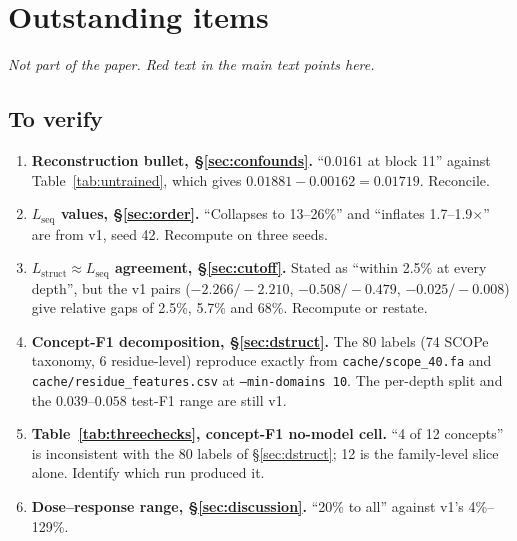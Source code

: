 \documentclass{article} %
\newcommand{\red}[1]{\textcolor{red}{#1}}
\renewcommand{\red}[1]{#1}
\newcommand{\Lstruct}{\ensuremath{L_{\mathrm{struct}}}}
\newcommand{\Lseq}{\ensuremath{L_{\mathrm{seq}}}}
\begin{document}



\appendix

\ifdefined\CLEANCOPY\else
\section{Outstanding items}
\label{app:working}

\red{\emph{Not part of the paper. Red text in the main text points here.}}

\subsection{To verify}

\begin{enumerate}[label=C\arabic*., ref=C\arabic*, leftmargin=2.6em]

\item \label{c:recon} \textbf{Reconstruction bullet, \S\ref{sec:confounds}.} ``$0.0161$ at block
11'' against Table~\ref{tab:untrained}, which gives $0.01881 - 0.00162 = 0.01719$. Reconcile.

\item \label{c:lseq} \textbf{\Lseq{} values, \S\ref{sec:order}.} ``Collapses to 13--26\%'' and
``inflates 1.7--1.9$\times$'' are from v1, seed 42. Recompute on three seeds.

\item \label{c:agreement} \textbf{$\Lstruct \approx \Lseq$ agreement, \S\ref{sec:cutoff}.} Stated
as ``within 2.5\% at every depth'', but the v1 pairs ($-2.266 / -2.210$, $-0.508 / -0.479$,
$-0.025 / -0.008$) give relative gaps of 2.5\%, 5.7\% and 68\%. Recompute or restate.

\item \label{c:conceptdecomp} \textbf{Concept-F1 decomposition, \S\ref{sec:dstruct}.} The 80
labels (74 SCOPe taxonomy, 6 residue-level) reproduce exactly from \texttt{cache/scope\_40.fa} and
\texttt{cache/residue\_features.csv} at \texttt{--min-domains 10}. The per-depth split and the
$0.039$--$0.058$ test-F1 range are still v1.

\item \label{c:concept12} \textbf{Table~\ref{tab:threechecks}, concept-F1 no-model cell.} ``4 of 12 concepts'' is
inconsistent with the 80 labels of \S\ref{sec:dstruct}; 12 is the family-level slice alone.
Identify which run produced it.

\item \label{c:dose} \textbf{Dose--response range, \S\ref{sec:discussion}.} ``20\% to all''
against v1's 4\%--129\%.

\end{enumerate}
\end{document}
